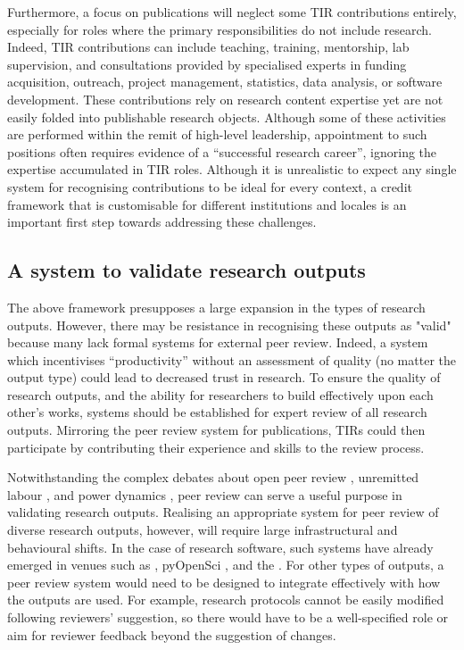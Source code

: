 \documentclass[authordate,meta]{jote-new-article}
\begin{document}
Furthermore, a focus on publications will neglect some TIR contributions entirely, especially for roles where the primary responsibilities do not include research. Indeed, TIR contributions can include teaching, training, mentorship, lab supervision, and consultations provided by specialised experts in funding acquisition, outreach, project management, statistics, data analysis, or software development. These contributions rely on research content expertise yet are not easily folded into publishable research objects. Although some of these activities are performed within the remit of high-level leadership, appointment to such positions often requires evidence of a “successful research career”, ignoring the expertise accumulated in TIR roles. Although it is unrealistic to expect any single system for recognising contributions to be ideal for every context, a credit framework that is customisable for different institutions and locales is an important first step towards addressing these challenges.



\subsection{A system to validate research outputs}



The above framework presupposes a large expansion in the types of research outputs. However, there may be resistance in recognising these outputs as "valid" because many lack formal systems for external peer review. Indeed, a system which incentivises “productivity” without an assessment of quality (no matter the output type) could lead to decreased trust in research. To ensure the quality of research outputs, and the ability for researchers to build effectively upon each other's works, systems should be established for expert review of all research outputs. Mirroring the peer review system for publications, TIRs could then participate by contributing their experience and skills to the review process.



Notwithstanding the complex debates about open peer review \parencites{Heesen2021}{Ross-Hellauer2017}, unremitted labour \parencites{Aczel2021}, and power dynamics \parencites{Huber2022}, peer review can serve a useful purpose in validating research outputs. Realising an appropriate system for peer review of diverse research outputs, however, will require large infrastructural and behavioural shifts. In the case of research software, such systems have already emerged in venues such as \textcites{Ropensci2022}, pyOpenSci \parencites{Holdgraf2022}, and the \textcites{JournalofOpenSourceSoftware2022}. For other types of outputs, a peer review system would need to be designed to integrate effectively with how the outputs are used. For example, research protocols cannot be easily modified following reviewers' suggestion, so there would have to be a well-specified role or aim for reviewer feedback beyond the suggestion of changes.
\end{document}
